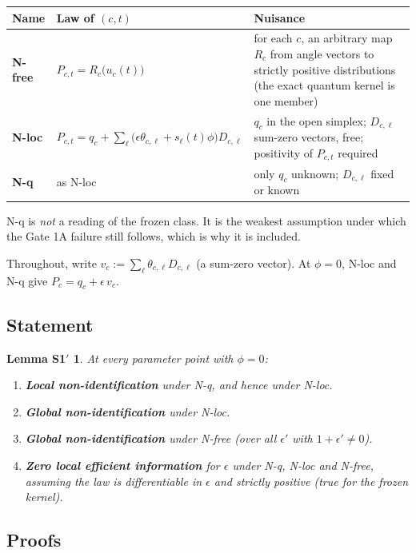 \documentclass[11pt,a4paper]{article}
\theoremstyle{plain}
\newtheorem*{lemmaSone}{Lemma S1$'$}
\theoremstyle{definition}
\theoremstyle{remark}
\newcommand{\eps}{\epsilon}
\begin{document}
\medskip
\noindent\begin{tabularx}{\linewidth}{@{}l>{\raggedright\arraybackslash}X>{\raggedright\arraybackslash}X@{}}
\toprule
Name & Law of $(c,t)$ & Nuisance \\
\midrule
\textbf{N-free} & $P_{c,t}=R_c\big(u_c(t)\big)$ & for each $c$, an arbitrary map $R_c$ from angle vectors to strictly positive distributions (the exact quantum kernel is one member) \\[3pt]
\textbf{N-loc} & $P_{c,t}=q_c+\sum_\ell\big(\eps\theta_{c,\ell}+s_\ell(t)\phi\big)D_{c,\ell}$ & $q_c$ in the open simplex; $D_{c,\ell}$ sum-zero vectors, free; positivity of $P_{c,t}$ required \\[3pt]
\textbf{N-q} & as N-loc & only $q_c$ unknown; $D_{c,\ell}$ fixed or known \\
\bottomrule
\end{tabularx}

\medskip
N-q is \emph{not} a reading of the frozen class. It is the weakest assumption under which the
Gate 1A failure still follows, which is why it is included.

Throughout, write $v_c := \sum_\ell \theta_{c,\ell} D_{c,\ell}$ (a sum-zero vector). At $\phi=0$,
N-loc and N-q give $P_c = q_c + \eps\, v_c$.

\subsection{Statement}

\begin{lemmaSone}
At every parameter point with $\phi=0$:
\begin{enumerate}[label=\textup{(\arabic*)},itemsep=3pt]
\item \textbf{Local non-identification} under N-q, and hence under N-loc.
\item \textbf{Global non-identification} under N-loc.
\item \textbf{Global non-identification} under N-free (over all $\eps'$ with $1+\eps'\neq0$).
\item \textbf{Zero local efficient information} for $\eps$ under N-q, N-loc and N-free, assuming the law is
differentiable in $\eps$ and strictly positive (true for the frozen kernel).
\end{enumerate}
\end{lemmaSone}

\subsection{Proofs}
\end{document}
